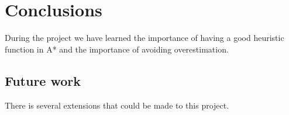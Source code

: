 \chapter{Conclusions}
During the project we have learned the importance of having a good heuristic function in A* and the importance of avoiding overestimation. 

\section{Future work}
There is several extensions that could be made to this project. 
